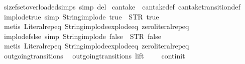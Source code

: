 \begin{isabellebody}
{\isasymrparr}{\isachardoublequoteclose}\isanewline
\isanewline
{}\isamarkupfalse%
\ size{\isacharunderscore}fset{\isacharunderscore}overloaded{\isacharunderscore}simps\ {\isacharbrackleft}simp\ del{\isacharbrackright}\isanewline
\isanewline
{}\isamarkupfalse%
\ can{\isacharunderscore}take\ {\isacharequal}\ can{\isacharunderscore}take{\isacharunderscore}def\ can{\isacharunderscore}take{\isacharunderscore}transition{\isacharunderscore}def\isanewline
\isanewline
{}\isamarkupfalse%
\ implode{\isacharunderscore}true\ {\isacharbrackleft}simp{\isacharbrackright}{\isacharcolon}\ {\isachardoublequoteopen}String{\isachardot}implode\ {\isacharprime}{\isacharprime}true{\isacharprime}{\isacharprime}\ {\isacharequal}\ STR\ {\isacharprime}{\isacharprime}true{\isacharprime}{\isacharprime}{\isachardoublequoteclose}\isanewline
%
\isadelimproof
\ \ %
\endisadelimproof
%
\isatagproof
{}\isamarkupfalse%
\ {\isacharparenleft}metis\ Literal{\isachardot}rep{\isacharunderscore}eq\ String{\isachardot}implode{\isacharunderscore}explode{\isacharunderscore}eq\ zero{\isacharunderscore}literal{\isachardot}rep{\isacharunderscore}eq{\isacharparenright}%
\endisatagproof
{\isafoldproof}%
%
\isadelimproof
\isanewline
%
\endisadelimproof
\isanewline
{}\isamarkupfalse%
\ implode{\isacharunderscore}fslse\ {\isacharbrackleft}simp{\isacharbrackright}{\isacharcolon}\ {\isachardoublequoteopen}String{\isachardot}implode\ {\isacharprime}{\isacharprime}false{\isacharprime}{\isacharprime}\ {\isacharequal}\ STR\ {\isacharprime}{\isacharprime}false{\isacharprime}{\isacharprime}{\isachardoublequoteclose}\isanewline
%
\isadelimproof
\ \ %
\endisadelimproof
%
\isatagproof
{}\isamarkupfalse%
\ {\isacharparenleft}metis\ Literal{\isachardot}rep{\isacharunderscore}eq\ String{\isachardot}implode{\isacharunderscore}explode{\isacharunderscore}eq\ zero{\isacharunderscore}literal{\isachardot}rep{\isacharunderscore}eq{\isacharparenright}%
\endisatagproof
{\isafoldproof}%
%
\isadelimproof
\isanewline
%
\endisadelimproof
\isanewline
{}\isamarkupfalse%
\ outgoing{\isacharunderscore}transitions{\isacharunderscore}{}{\isacharcolon}\isanewline
\ \ {\isachardoublequoteopen}outgoing{\isacharunderscore}transitions\ lift\ {}\ {\isacharequal}\ {\isacharbraceleft}{\isacharbar}{\isacharparenleft}{\isacharparenleft}{}{\isacharcomma}\ {}{\isacharparenright}{\isacharcomma}\ continit{\isacharparenright}{\isacharbar}{\isacharbraceright}{\isachardoublequoteclose}\isanewline
%
\isadelimproof

\end{isabellebody}

